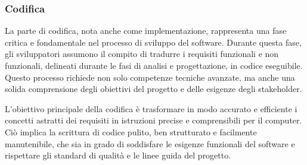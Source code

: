 \subsubsection{Codifica}
La parte di codifica, nota anche come implementazione, rappresenta una fase critica e fondamentale nel processo di sviluppo del software. Durante questa fase, gli sviluppatori assumono il compito di tradurre i requisiti funzionali e non funzionali, delineati durante le fasi di analisi e progettazione, in codice eseguibile. Questo processo richiede non solo competenze tecniche avanzate, ma anche una solida comprensione degli obiettivi del progetto e delle esigenze degli stakeholder.

L'obiettivo principale della codifica è trasformare in modo accurato e efficiente i concetti astratti dei requisiti in istruzioni precise e comprensibili per il computer. Ciò implica la scrittura di codice pulito, ben strutturato e facilmente manutenibile, che sia in grado di soddisfare le esigenze funzionali del software e rispettare gli standard di qualità e le linee guida del progetto.

